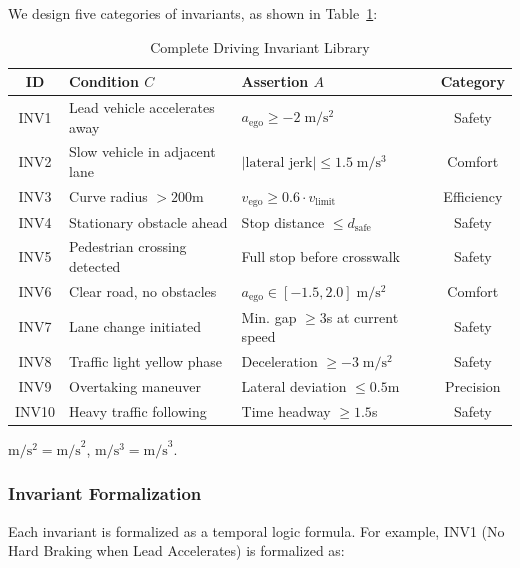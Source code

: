 \documentclass[conference]{IEEEtran}
\theoremstyle{plain}
\begin{document}
We design five categories of invariants, as shown in Table~\ref{tab:invariants}:

\begin{table}[h]
\centering
\caption{Complete Driving Invariant Library}
\label{tab:invariants}
\small
\begin{tabular}{cp{2.2cm}p{3.2cm}c}
\toprule
\textbf{ID} & \textbf{Condition $C$} & \textbf{Assertion $A$} & \textbf{Category} \\
\midrule
INV1 & Lead vehicle accelerates away & $a_{\text{ego}} \geq -2\;\si{\meter\per\square\second}$ & Safety \\
INV2 & Slow vehicle in adjacent lane & $|\text{lateral jerk}| \leq 1.5\;\si{\meter\per\cubic\second}$ & Comfort \\
INV3 & Curve radius $> 200$m & $v_{\text{ego}} \geq 0.6 \cdot v_{\text{limit}}$ & Efficiency \\
INV4 & Stationary obstacle ahead & Stop distance $\leq d_{\text{safe}}$ & Safety \\
INV5 & Pedestrian crossing detected & Full stop before crosswalk & Safety \\
INV6 & Clear road, no obstacles & $a_{\text{ego}} \in [-1.5, 2.0]\;\si{\meter\per\square\second}$ & Comfort \\
INV7 & Lane change initiated & Min. gap $\geq 3$s at current speed & Safety \\
INV8 & Traffic light yellow phase & Deceleration $\geq -3\;\si{\meter\per\square\second}$ & Safety \\
INV9 & Overtaking maneuver & Lateral deviation $\leq 0.5$m & Precision \\
INV10 & Heavy traffic following & Time headway $\geq 1.5$s & Safety \\
\midrule
\end{tabular}
\begin{tablenotes}\footnotesize
\item $\si{\meter\per\square\second} = \text{m/s}^2$, $\si{\meter\per\cubic\second} = \text{m/s}^3$.
\end{tablenotes}
\end{table}

\subsubsection{Invariant Formalization}

Each invariant is formalized as a temporal logic formula. For example, INV1 (No Hard Braking when Lead Accelerates) is formalized as:
\end{document}
